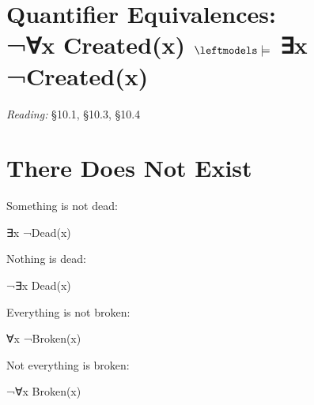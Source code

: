 \documentclass[12pt]{extarticle}
\begin{document}
\begin{multicols*}{3}
\begin{enumerate}
\end{enumerate}
 
 
 
\section{Quantifier Equivalences: \\ ¬∀x Created(x) $\leftmodels\models$ ∃x ¬Created(x)}
 
\emph{Reading:} §10.1, §10.3, §10.4
 
 
\section{There Does Not Exist}
 
Something is not dead:
 
\hspace{3mm} ∃x ¬Dead(x)
 
Nothing is dead:
 
\hspace{3mm} ¬∃x Dead(x)
 
Everything is not broken:
 
\hspace{3mm} ∀x ¬Broken(x)
 
Not everything is broken:
 
\hspace{3mm} ¬∀x Broken(x)
 

\end{multicols*}
\end{document}
